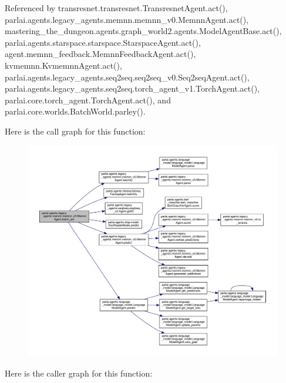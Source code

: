 Referenced by transresnet.\+transresnet.\+Transresnet\+Agent.\+act(), parlai.\+agents.\+legacy\+\_\+agents.\+memnn.\+memnn\+\_\+v0.\+Memnn\+Agent.\+act(), mastering\+\_\+the\+\_\+dungeon.\+agents.\+graph\+\_\+world2.\+agents.\+Model\+Agent\+Base.\+act(), parlai.\+agents.\+starspace.\+starspace.\+Starspace\+Agent.\+act(), agent.\+memnn\+\_\+feedback.\+Memnn\+Feedback\+Agent.\+act(), kvmemnn.\+Kvmemnn\+Agent.\+act(), parlai.\+agents.\+legacy\+\_\+agents.\+seq2seq.\+seq2seq\+\_\+v0.\+Seq2seq\+Agent.\+act(), parlai.\+agents.\+legacy\+\_\+agents.\+seq2seq.\+torch\+\_\+agent\+\_\+v1.\+Torch\+Agent.\+act(), parlai.\+core.\+torch\+\_\+agent.\+Torch\+Agent.\+act(), and parlai.\+core.\+worlds.\+Batch\+World.\+parley().

Here is the call graph for this function\+:
\nopagebreak
\begin{figure}[H]
\begin{center}
\leavevmode
\includegraphics[width=350pt]{classparlai_1_1agents_1_1legacy__agents_1_1memnn_1_1memnn__v0_1_1MemnnAgent_ad73ed6e730b608491c2d8ef3ad25e32a_cgraph}
\end{center}
\end{figure}
Here is the caller graph for this function\+:
\nopagebreak

